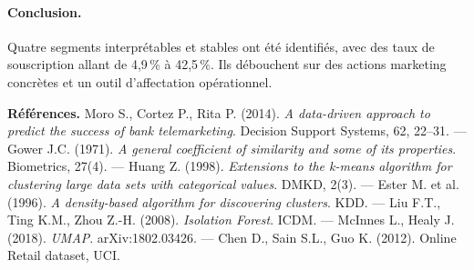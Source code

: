\documentclass[11pt,a4paper]{article}
\begin{document}
\paragraph{Conclusion.} Quatre segments interprétables et stables ont été identifiés, avec des taux de souscription allant de 4,9\,\% à 42,5\,\%. Ils débouchent sur des actions marketing concrètes et un outil d'affectation opérationnel.

\vspace{.5cm}
\noindent\textbf{Références.} Moro S., Cortez P., Rita P. (2014). \textit{A data-driven approach to predict the success of bank telemarketing}. Decision Support Systems, 62, 22–31. — Gower J.C. (1971). \textit{A general coefficient of similarity and some of its properties}. Biometrics, 27(4). — Huang Z. (1998). \textit{Extensions to the k-means algorithm for clustering large data sets with categorical values}. DMKD, 2(3). — Ester M. et al. (1996). \textit{A density-based algorithm for discovering clusters}. KDD. — Liu F.T., Ting K.M., Zhou Z.-H. (2008). \textit{Isolation Forest}. ICDM. — McInnes L., Healy J. (2018). \textit{UMAP}. arXiv:1802.03426. — Chen D., Sain S.L., Guo K. (2012). Online Retail dataset, UCI.
\end{document}

